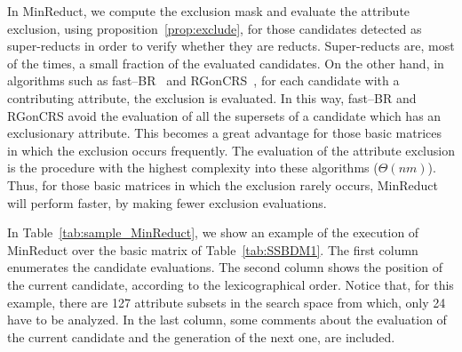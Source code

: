 \documentclass[authoryear,preprint,review,12pt]{elsarticle}
\begin{document}
	In MinReduct, we compute the exclusion mask and evaluate the attribute exclusion, using proposition~\ref{prop:exclude}, for those candidates detected as super-reducts in order to verify whether they are reducts. Super-reducts are, most of the times, a small fraction of the evaluated candidates. On the other hand, in algorithms such as fast--BR~\cite{Lias13} and RGonCRS~\cite{WangP07}, for each candidate with a contributing attribute, the exclusion is evaluated. In this way, fast--BR and RGonCRS avoid the evaluation of all the supersets of a candidate which has an exclusionary attribute. This becomes a great advantage for those basic matrices in which the exclusion occurs frequently. The evaluation of the attribute exclusion is the procedure with the highest complexity into these algorithms ($\Theta (nm)$). Thus, for those basic matrices in which the exclusion rarely occurs, MinReduct will perform faster, by making fewer exclusion evaluations.
	
		
	In Table~\ref{tab:sample_MinReduct}, we show an example of the execution of MinReduct over the basic matrix of Table~\ref{tab:SSBDM1}. The first column enumerates the candidate evaluations. The second column shows the position of the current candidate, according to the lexicographical order. Notice that, for this example, there are 127 attribute subsets in the search space from which, only 24 have to be analyzed. In the last column, some comments about the evaluation of the current candidate and the generation of the next one, are included.
	
\end{document}
